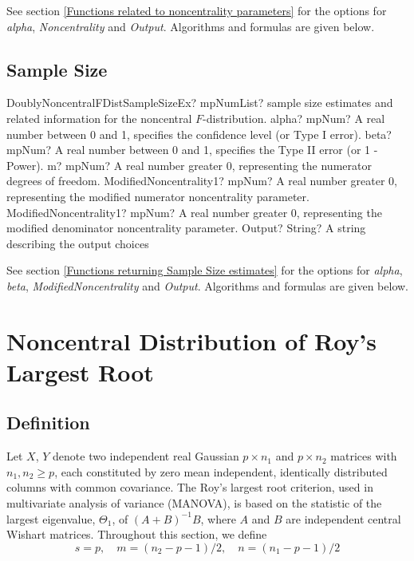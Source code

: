 \vspace{0.3cm}
See section \ref{Functions related to noncentrality parameters} for the options for  {\itshape\sffamily alpha}, {\itshape\sffamily Noncentrality} and {\itshape\sffamily Output}. Algorithms and formulas are given below.




\subsection{Sample Size}
\label{DoublyNonCentralFDistributionSampleSize}


\begin{mpFunctionsExtract}
	\mpFunctionSixNotImplemented
	{DoublyNoncentralFDistSampleSizeEx? mpNumList? sample size estimates and related information for the noncentral $F$-distribution.}
	{alpha? mpNum? A real number between 0 and 1, specifies the confidence level (or Type I error).}
	{beta? mpNum?  A real number between 0 and 1, specifies the Type II error (or 1 - Power).}
	{m? mpNum? A real number greater 0, representing the numerator  degrees of freedom.}
	{ModifiedNoncentrality1? mpNum? A real number greater 0, representing the modified numerator noncentrality parameter.}
	{ModifiedNoncentrality1? mpNum? A real number greater 0, representing the modified denominator noncentrality parameter.}
	{Output? String? A string describing the output choices}
\end{mpFunctionsExtract}


\vspace{0.3cm}
See section \ref{Functions returning Sample Size estimates} for the options for  {\itshape\sffamily alpha}, {\itshape\sffamily beta}, {\itshape\sffamily ModifiedNoncentrality} and {\itshape\sffamily Output}. Algorithms and formulas are given below.






\newpage
\section{Noncentral Distribution of Roy's Largest Root}

\subsection{Definition}

Let $X$, $Y$ denote two independent real Gaussian $p \times n_1$ and $p \times n_2$ matrices with $n_1, n_2 \geq p$, each constituted by zero mean independent, identically distributed columns with common covariance. The Roy's largest root criterion, used in multivariate analysis of variance (MANOVA), is based on the statistic of the largest eigenvalue, $\Theta_1$, of $(A+ B)^{-1}B$, where $A$ and $B$ are independent central Wishart matrices. Throughout this section, we define
\begin{equation}
	s=p, \quad  m=(n_2-p-1)/2, \quad  n=(n_1-p-1)/2
\end{equation}



